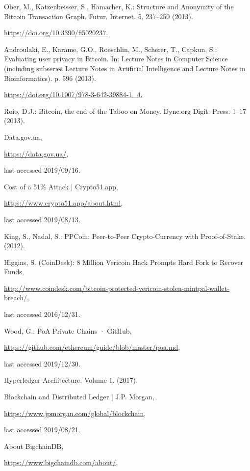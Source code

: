 \begin{multicols}{2}
\begin{thebibliography}{99}
 Ober, M., Katzenbeisser, S., Hamacher, K.: Structure and Anonymity of the Bitcoin Transaction Graph. Futur. Internet. 5, 237–250 (2013). 

\url{https://doi.org/10.3390/fi5020237.}

 Androulaki, E., Karame, G.O., Roeschlin, M., Scherer, T., Capkun, S.: Evaluating user privacy in Bitcoin. In: Lecture Notes in Computer Science (including subseries Lecture Notes in Artificial Intelligence and Lecture Notes in Bioinformatics). p. 596 (2013).

\url{https://doi.org/10.1007/978-3-642-39884-1\_4.}

 Roio, D.J.: Bitcoin, the end of the Taboo on Money. Dyne.org Digit. Press. 1–17 (2013).

 Data.gov.ua, 

\url{https://data.gov.ua/}, 

last accessed 2019/09/16.

 Cost of a 51\% Attack | Crypto51.app, 

\url{https://www.crypto51.app/about.html},

 last accessed 2019/08/13.

 King, S., Nadal, S.: PPCoin: Peer-to-Peer Crypto-Currency with Proof-of-Stake. (2012).

 Higgins, S. (CoinDesk): 8 Million Vericoin Hack Prompts Hard Fork to Recover Funds,
 
 \url{http://www.coindesk.com/bitcoin-protected-vericoin-stolen-mintpal-wallet-breach/},
 
  last accessed 2016/12/31.

 Wood, G.: PoA Private Chains · GitHub, 

\url{https://github.com/ethereum/guide/blob/master/poa.md},

last accessed 2019/12/30.

 Hyperledger Architecture, Volume 1. (2017).

 Blockchain and Distributed Ledger | J.P. Morgan, 

\url{https://www.jpmorgan.com/global/blockchain},

last accessed 2019/08/21.

 About BigchainDB, 

\url{https://www.bigchaindb.com/about/},


\end{thebibliography}
\end{multicols}
